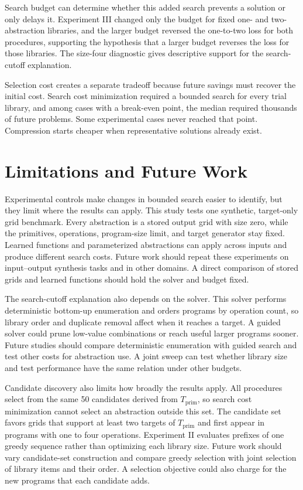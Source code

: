 \documentclass[10pt]{article}
\begin{document}
Search budget can determine whether this added search prevents a solution or
only delays it. Experiment III changed only the budget for fixed one- and
two-abstraction libraries, and the larger budget reversed the one-to-two loss
for both procedures, supporting the hypothesis that a larger budget reverses
the loss for those libraries. The size-four diagnostic gives descriptive
support for the search-cutoff explanation.

Selection cost creates a separate tradeoff because future savings must recover
the initial cost. Search cost minimization required a bounded search for every
trial library, and among cases with a break-even point, the median required
thousands of future problems. Some experimental cases never reached that
point. Compression starts cheaper when representative solutions already
exist.

\section{Limitations and Future Work}

Experimental controls make changes in bounded search easier to identify, but
they limit where the results can apply. This study tests one synthetic,
target-only grid benchmark. Every abstraction is a stored output grid with size
zero, while the primitives, operations, program-size limit, and target generator
stay fixed.
Learned functions and parameterized abstractions can apply across inputs and
produce different search costs. Future work should repeat these experiments on
input--output synthesis tasks and in other domains.
A direct comparison of stored grids and learned functions should hold the
solver and budget fixed.

The search-cutoff explanation also depends on the solver. This solver performs
deterministic bottom-up enumeration and orders programs by operation count,
so library order and duplicate removal affect when it reaches a target. A
guided solver could prune low-value combinations or reach useful larger
programs sooner. Future studies should compare deterministic enumeration with
guided search and test other costs for abstraction use. A joint sweep can test
whether library size and test performance have the same relation under other
budgets.

Candidate discovery also limits how broadly the results apply. All procedures
select from the same 50 candidates derived from
$T_{\mathrm{prim}}$, so search cost minimization cannot select an
abstraction outside this set. The candidate set favors grids that support at
least two targets of $T_{\mathrm{prim}}$ and first appear in
programs with one to four operations. Experiment II evaluates prefixes of one
greedy sequence rather than optimizing each library size. Future work should
vary candidate-set construction and compare greedy selection with joint
selection of library items and their order. A selection objective could also
charge for the new programs that each candidate adds.
\end{document}
